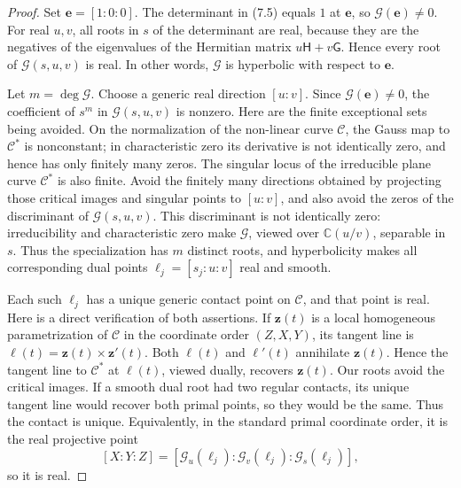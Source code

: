 \documentclass[11pt]{article}
\theoremstyle{definition}
\theoremstyle{remark}
\begin{document}
\begin{proof}
Set \(\mathbf e=[1:0:0]\).  The determinant in (7.5) equals \(1\) at
\(\mathbf e\), so \(\mathscr G(\mathbf e)\neq0\).  For real \(u,v\), all roots
in \(s\) of the determinant are real, because they are the negatives of the
eigenvalues of the Hermitian matrix \(u\mathsf H+v\mathsf G\).  Hence every root of
\(\mathscr G(s,u,v)\) is real.  In other words, \(\mathscr G\) is hyperbolic
with respect to \(\mathbf e\).

Let \(m=\deg\mathscr G\).  Choose a generic real direction \([u:v]\).  Since
\(\mathscr G(\mathbf e)\neq0\), the coefficient of \(s^m\) in
\(\mathscr G(s,u,v)\) is nonzero.  Here are the finite exceptional sets being
avoided.  On the normalization of the non-linear curve \(\mathscr C\), the
Gauss map to \(\mathscr C^*\) is nonconstant; in characteristic zero its
derivative is not identically zero, and hence has only finitely many zeros.
The singular locus of the irreducible plane curve \(\mathscr C^*\) is also
finite.  Avoid the finitely many directions obtained by projecting those
critical images and singular points to \([u:v]\), and also avoid the zeros of
the discriminant of \(\mathscr G(s,u,v)\).  This discriminant is not
identically zero: irreducibility and characteristic zero make
\(\mathscr G\), viewed over \(\mathbb C(u/v)\), separable in \(s\).  Thus the
specialization has
\(m\) distinct roots, and
hyperbolicity makes all corresponding dual points
\(\ell_j=[s_j:u:v]\) real and smooth.

Each such \(\ell_j\) has a unique generic contact point on \(\mathscr C\), and
that point is real.  Here is a direct verification of both assertions.  If
\(\mathbf z(t)\) is a local homogeneous parametrization of \(\mathscr C\) in
the coordinate order \((Z,X,Y)\), its tangent line is
\(\boldsymbol\ell(t)=\mathbf z(t)\times\mathbf z'(t)\).  Both
\(\boldsymbol\ell(t)\) and \(\boldsymbol\ell'(t)\) annihilate
\(\mathbf z(t)\).  Hence the tangent line to \(\mathscr C^*\) at
\(\boldsymbol\ell(t)\), viewed dually, recovers \(\mathbf z(t)\).  Our roots
avoid the critical images.  If a smooth dual root had two regular contacts,
its unique tangent line would recover both primal points, so they would be
the same.  Thus the contact is unique.  Equivalently, in the standard primal
coordinate order,
it is the real projective point
\[
 [X:Y:Z]=[\mathscr G_u(\ell_j):\mathscr G_v(\ell_j):
   \mathscr G_s(\ell_j)],
\]
so it is real.


\end{proof}
\end{document}
